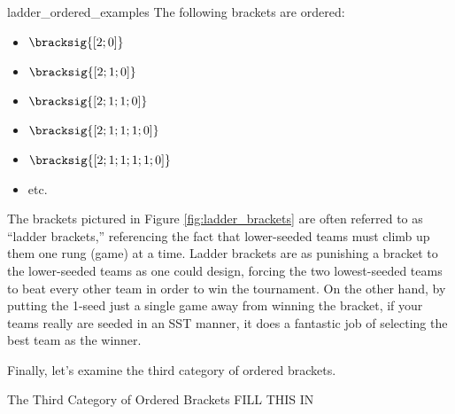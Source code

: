 {\begin{corollary}{}{ladder_ordered_examples}
    The following brackets are ordered:
    \begin{itemize}
        \item $\bracksig{[2; 0]}$
        \item $\bracksig{[2; 1; 0]}$
        \item $\bracksig{[2; 1; 1; 0]}$
        \item $\bracksig{[2; 1; 1; 1; 0]}$
        \item $\bracksig{[2; 1; 1; 1; 1; 0]}$
        \item etc.
    \end{itemize}
\end{corollary}


The brackets pictured in Figure \ref{fig:ladder_brackets} are often referred to as ``ladder brackets,'' referencing the fact that lower-seeded teams must climb up them one rung (game) at a time. Ladder brackets are as punishing a bracket to the lower-seeded teams as one could design, forcing the two lowest-seeded teams to beat every other team in order to win the tournament. On the other hand, by putting the 1-seed just a single game away from winning the bracket, if your teams really are seeded in an SST manner, it does a fantastic job of selecting the best team as the winner.

Finally, let's examine the third category of ordered brackets.

\begin{definition}{The Third Category of Ordered Brackets}{}
    FILL THIS IN
\end{definition}





}